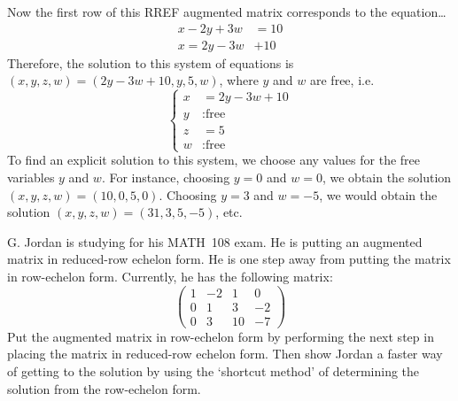 \documentclass[12pt,letterpaper]{exam}
\begin{document}
\begin{questions}
{Now the first row of this RREF augmented matrix corresponds to the equation\dots
	\[
	\begin{aligned}
	x - 2y + 3w&= 10 \\
	x= 2y - 3w& + 10
	\end{aligned}
	\]
Therefore, the solution to this system of equations is $(x, y, z, w)= (2y - 3w + 10, y, 5, w)$, where $y$ and $w$ are free, i.e.
	\[
	\left\{
	\begin{aligned}
	x&= 2y - 3w + 10 \\
	y&: \text{free} \\
	z&= 5 \\
	w&: \text{free}
	\end{aligned} \right.
	\]
To find an explicit solution to this system, we choose any values for the free variables $y$ and $w$. For instance, choosing $y= 0$ and $w= 0$, we obtain the solution $(x, y, z, w)= (10, 0, 5, 0)$. Choosing $y= 3$ and $w= -5$, we would obtain the solution $(x, y, z, w)= (31, 3, 5, -5)$, etc. 
}



\newpage
\question[10] G. Jordan is studying for his MATH~108 exam. He is putting an augmented matrix in reduced-row echelon form. He is one step away from putting the matrix in row-echelon form. Currently, he has the following matrix:
	\[
	\begin{pmatrix}
	1 & -2 & 1 & 0 \\
	0 & 1 & 3 & -2 \\
	0 & 3 & 10 & -7
	\end{pmatrix}
	\]
Put the augmented matrix in row-echelon form by performing the next step in placing the matrix in reduced-row echelon form. Then show Jordan a faster way of getting to the solution by using the `shortcut method' of determining the solution from the row-echelon form. \pvspace{0.3cm}


\end{questions}
\end{document}
